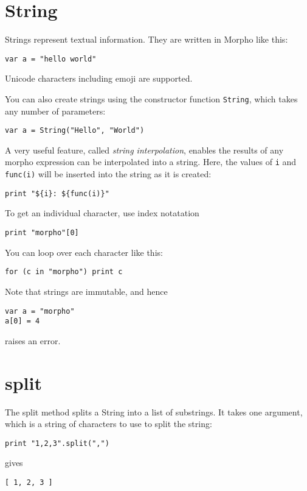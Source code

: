 \hypertarget{string}{%
\section{String}\label{string}}

Strings represent textual information. They are written in Morpho like
this:

\begin{lstlisting}
var a = "hello world"
\end{lstlisting}

Unicode characters including emoji are supported.

You can also create strings using the constructor function
\texttt{String}, which takes any number of parameters:

\begin{lstlisting}
var a = String("Hello", "World")
\end{lstlisting}

A very useful feature, called \emph{string interpolation}, enables the
results of any morpho expression can be interpolated into a string.
Here, the values of \texttt{i} and \texttt{func(i)} will be inserted
into the string as it is created:

\begin{lstlisting}
print "${i}: ${func(i)}"
\end{lstlisting}

To get an individual character, use index notatation

\begin{lstlisting}
print "morpho"[0]
\end{lstlisting}

You can loop over each character like this:

\begin{lstlisting}
for (c in "morpho") print c
\end{lstlisting}

Note that strings are immutable, and hence

\begin{lstlisting}
var a = "morpho"
a[0] = 4
\end{lstlisting}

raises an error.

\hypertarget{split}{%
\section{split}\label{split}}

The split method splits a String into a list of substrings. It takes one
argument, which is a string of characters to use to split the string:

\begin{lstlisting}
print "1,2,3".split(",")
\end{lstlisting}

gives

\begin{lstlisting}
[ 1, 2, 3 ]
\end{lstlisting}
